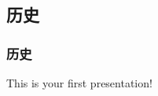\documentclass{beamer}
\begin{document}
{    \subsection{历史}
    \begin{frame} \frametitle{历史}
        This is your first presentation!
    \end{frame}



} %
\end{document}
